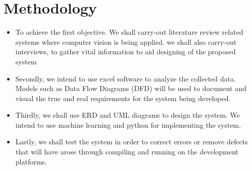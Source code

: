 \documentclass[11pt]{article}
\begin{document}
	   
	   
	   
	   \section{\textbf{Methodology}}
	   
	   		\begin{itemize}
	   	\item	To achieve the first objective. We shall carry-out literature review related systems where computer vision is being applied. we shall also carry-out interviews, to gather vital information to aid designing of the proposed system
	   	\item	Secondly, we intend to use excel software to analyze the collected data. Models such as Data Flow Diagrams (DFD) will be used to document and visual the true and real requirements for the system being developed.
	   	\item	Thirdly, we shall use ERD and UML diagrams to design the system. We intend to use machine learning and python for implementing the system.
	   	\item	Lastly, we shall test the system in order to correct errors or remove defects that will have arose through compiling and running on the development platforms.
	   		\end{itemize}
	   		
    	
    	 
       
\end{document}
